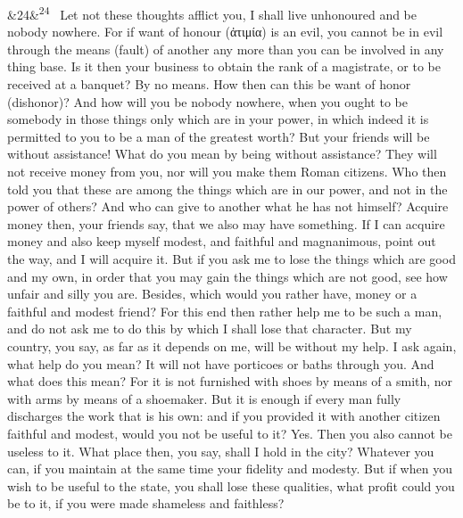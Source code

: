 \documentclass[12pt]{article}
\newcommand{\para}[1][]{\par\noindent\ifx&#1&\else\textsuperscript{\footnotesize #1}~\fi}
\begin{document}
\para[24] Let not these thoughts afflict you, I shall live unhonoured and be nobody nowhere. For if want of honour (ἀτιμία) is an evil, you cannot be in evil through the means (fault) of another any more than you can be involved in any thing base. Is it then your business to obtain the rank of a magistrate, or to be received at a banquet? By no means. How then can this be want of honor (dishonor)? And how will you be nobody nowhere, when you ought to be somebody in those things only which are in your power, in which indeed it is permitted to you to be a man of the greatest worth? But your friends will be without assistance! What do you mean by being without assistance? They will not receive money from you, nor will you make them Roman citizens. Who then told you that these are among the things which are in our power, and not in the power of others? And who can give to another what he has not himself? Acquire money then, your friends say, that we also may have something. If I can acquire money and also keep myself modest, and faithful and magnanimous, point out the way, and I will acquire it. But if you ask me to lose the things which are good and my own, in order that you may gain the things which are not good, see how unfair and silly you are. Besides, which would you rather have, money or a faithful and modest friend? For this end then rather help me to be such a man, and do not ask me to do this by which I shall lose that character. But my country, you say, as far as it depends on me, will be without my help. I ask again, what help do you mean? It will not have porticoes or baths through you. And what does this mean? For it is not furnished with shoes by means of a smith, nor with arms by means of a shoemaker. But it is enough if every man fully discharges the work that is his own: and if you provided it with another citizen faithful and modest, would you not be useful to it? Yes. Then you also cannot be useless to it. What place then, you say, shall I hold in the city? Whatever you can, if you maintain at the same time your fidelity and modesty. But if when you wish to be useful to the state, you shall lose these qualities, what profit could you be to it, if you were made shameless and faithless?
\end{document}

